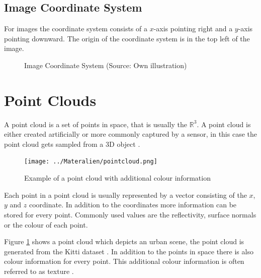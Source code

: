 \subsection{Image Coordinate System} \label{sec:theo:imageCoord}
For images the coordinate system consists of a $x$-axis pointing right and a $y$-axis pointing downward. The origin of the coordinate system is in the top left of the image.

\begin{figure}[h!]
    \centering
    \caption{Image Coordinate System (Source: Own illustration)}
\end{figure}

\section{Point Clouds}
A point cloud is a set of points in space, that is usually the $\mathbb{R}^3$. A point cloud is either created artificially or more commonly captured by a sensor, in
this case the point cloud gets sampled from a 3D object \cite{pclAbout}.

\begin{figure}[h!]
    \centering
    \texttt{[image: ../Materalien/pointcloud.png]}
    \caption{Example of a point cloud with additional colour information}
    \label{fig:theo:pc}
\end{figure}

Each point in a point cloud is usually represented by a vector consisting of the $x$, $y$ and $z$ coordinate. In addition to the coordinates more information can be stored for every point. Commonly used values are the reflectivity, surface normals or the colour of each point. 

Figure \ref{fig:theo:pc} shows a point cloud which depicts an urban scene,
the point cloud is generated from the Kitti dataset \cite{Menze2015CVPR}.
In addition to the points in space there is also colour information for every point.
This additional colour information is often referred to as texture \cite{pclAbout}.

